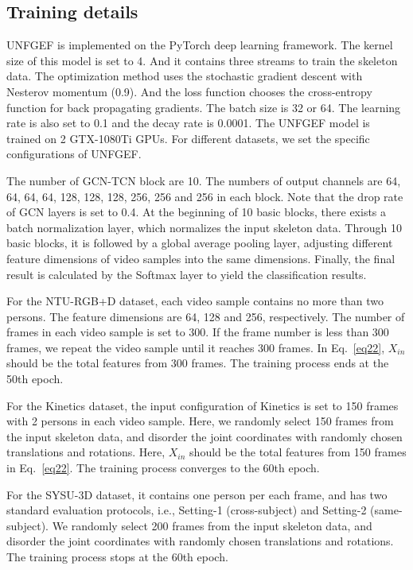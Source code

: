 \documentclass[journal]{IEEEtran}
\begin{document}
\subsection{Training details}
UNFGEF is implemented on the PyTorch deep learning framework. The kernel size of this model is set to 4. And it contains three streams to train the skeleton data. The optimization method uses the stochastic gradient descent with Nesterov momentum (0.9). And the loss function chooses the cross-entropy function for back propagating gradients. The batch size is 32 or 64. The learning rate is also set to 0.1 and the decay rate is 0.0001. The UNFGEF model is trained on 2 GTX-1080Ti GPUs. For different datasets, we set the specific configurations of UNFGEF.

The number of GCN-TCN block are 10. The numbers of output channels are 64, 64, 64, 64, 128, 128, 128, 256, 256 and 256 in each block. Note that the drop rate of GCN layers is set to 0.4. At the beginning of 10 basic blocks, there exists a batch normalization layer, which normalizes the input skeleton data. Through 10 basic blocks, it is followed by a global average pooling layer, adjusting different feature dimensions of video samples into the same dimensions. Finally, the final result is calculated by the Softmax layer to yield the classification results.

For the NTU-RGB+D dataset, each video sample contains no more than two persons. The feature dimensions are 64, 128 and 256, respectively. The number of frames in each video sample is set to 300. If the frame number is less than 300 frames, we repeat the video sample until it reaches 300 frames. In Eq.~\ref{eq22}, $X_{in}$ should be the total features from 300 frames. The training process ends at the 50th epoch.

For the Kinetics dataset, the input configuration of Kinetics is set to 150 frames with 2 persons in each video sample. Here, we randomly select 150 frames from the input skeleton data, and disorder the joint coordinates with randomly chosen translations and rotations. Here, $X_{in}$ should be the total features from 150 frames in Eq.~\ref{eq22}. The training process converges to the 60th epoch.

For the SYSU-3D dataset, it contains one person per each frame, and has two standard evaluation protocols, i.e., Setting-1 (cross-subject) and Setting-2 (same-subject). We randomly select 200 frames from the input skeleton data, and disorder the joint coordinates with randomly chosen translations and rotations. The training process stops at the 60th epoch.
\end{document}
